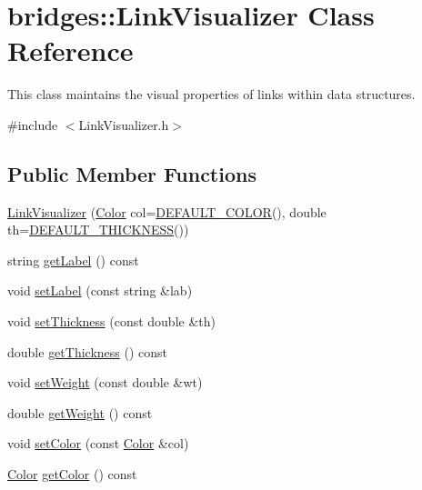 \hypertarget{classbridges_1_1_link_visualizer}{}\section{bridges\+:\+:Link\+Visualizer Class Reference}
\label{classbridges_1_1_link_visualizer}


This class maintains the visual properties of links within data structures.  




{\ttfamily \#include $<$Link\+Visualizer.\+h$>$}

\subsection*{Public Member Functions}
\begin{DoxyCompactItemize}
\item 
\mbox{\hyperlink{classbridges_1_1_link_visualizer_a69a84adf2b85773120d3f6afd938488e}{Link\+Visualizer}} (\mbox{\hyperlink{classbridges_1_1_color}{Color}} col=\mbox{\hyperlink{classbridges_1_1_link_visualizer_a5e121c52fc270337c58413d0fd72cf58}{D\+E\+F\+A\+U\+L\+T\+\_\+\+C\+O\+L\+OR}}(), double th=\mbox{\hyperlink{classbridges_1_1_link_visualizer_a6d05e052d64964d876f557901635079d}{D\+E\+F\+A\+U\+L\+T\+\_\+\+T\+H\+I\+C\+K\+N\+E\+SS}}())
\item 
string \mbox{\hyperlink{classbridges_1_1_link_visualizer_a4711364bd9108a03c6867ee2282d9fea}{get\+Label}} () const
\item 
void \mbox{\hyperlink{classbridges_1_1_link_visualizer_a7e590ad57c51ef16a1d46e05ffdf1fb3}{set\+Label}} (const string \&lab)
\item 
void \mbox{\hyperlink{classbridges_1_1_link_visualizer_a92a88e0e4c2f0c8c68f33578743c6502}{set\+Thickness}} (const double \&th)
\item 
double \mbox{\hyperlink{classbridges_1_1_link_visualizer_ae08a5f5fc9e83ea3b3d4ebebc245d3b4}{get\+Thickness}} () const
\item 
void \mbox{\hyperlink{classbridges_1_1_link_visualizer_a08b606d2451026a11e110d0b94f97538}{set\+Weight}} (const double \&wt)
\item 
double \mbox{\hyperlink{classbridges_1_1_link_visualizer_a2c59c476617c2520b4730a14df65400e}{get\+Weight}} () const
\item 
void \mbox{\hyperlink{classbridges_1_1_link_visualizer_adedc1f2b7d5d562b115ef9d8ae19fa73}{set\+Color}} (const \mbox{\hyperlink{classbridges_1_1_color}{Color}} \&col)
\item 
\mbox{\hyperlink{classbridges_1_1_color}{Color}} \mbox{\hyperlink{classbridges_1_1_link_visualizer_a794ab99f7dc3ec9b27961e7f6072181a}{get\+Color}} () const
\end{DoxyCompactItemize}
